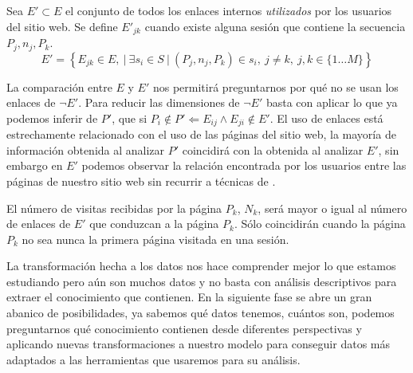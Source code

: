 \begin{defn}\label{def:1-2-4-cjto-enlacesInternosUsados}
   Sea $E' \subset E$ el conjunto de todos los enlaces internos \emph{utilizados} por los usuarios del sitio web. Se define $E'_{jk}$ cuando existe alguna sesión que contiene la secuencia $P_j, n_j, P_k$.
  \begin{equation}\label{eq:1-2-4-cjto-enlacesUsados}
    E' = \left\{E_{jk} \in E,\ | \ \exists s_i \in S \ | \ (P_j, n_j, P_k) \in s_i,\ j\neq k,\ j,k\in\{1\ldots M\}\right\}
  \end{equation}
\end{defn}

La comparación entre $E$ y $E'$ nos permitirá preguntarnos por qué no se usan los enlaces de $\neg E'$. Para reducir las dimensiones de $\neg E'$ basta con aplicar lo que ya podemos inferir de $P'$, que si $P_i \notin P' \Leftarrow E_{ij} \wedge E_{ji} \notin E'$. El uso de enlaces está estrechamente relacionado con el uso de las páginas del sitio web, la mayoría de información obtenida al analizar $P'$ coincidirá con la obtenida al analizar $E'$, sin embargo en $E'$ podemos observar la relación encontrada por los usuarios entre las páginas de nuestro sitio web sin recurrir a técnicas de \DM.

El número de visitas recibidas por la página $P_k$, $N_k$, será mayor o igual al número de enlaces de $E'$ que conduzcan a la página $P_k$. Sólo coincidirán cuando la página $P_k$ no sea nunca la primera página visitada en una sesión.

La transformación hecha a los datos nos hace comprender mejor lo que estamos estudiando pero aún son muchos datos y no basta con análisis descriptivos para extraer el conocimiento que contienen. En la siguiente fase se abre un gran abanico de posibilidades, ya sabemos qué datos tenemos, cuántos son, podemos preguntarnos qué conocimiento contienen desde diferentes perspectivas y aplicando nuevas transformaciones a nuestro modelo para conseguir datos más adaptados a las herramientas que usaremos para su análisis.
